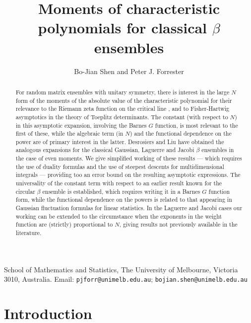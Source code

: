 \documentclass[11pt,a4paper]{article}
\title{\Large\bfseries Moments of characteristic polynomials for classical $\beta$ ensembles}%
\author{Bo-Jian Shen and Peter J. Forrester}
\date{}
\numberwithin{equation}{section} %
\theoremstyle{plain}
\theoremstyle{definition}
\numberwithin{prop}{section}
\numberwithin{cor}{section}
\numberwithin{remark}{section}
\begin{document}
\maketitle


School of Mathematics and Statistics,  The University of Melbourne,
Victoria 3010, Australia. \: \: Email: {\tt pjforr@unimelb.edu.au};  {\tt bojian.shen@unimelb.edu.au} \\








\bigskip

\begin{abstract}
\noindent
For random matrix ensembles with unitary symmetry, there is interest
in the large $N$ form of the moments of the absolute value of the characteristic polynomial for their relevance to the Riemann zeta function on the critical line , and to Fisher-Hartwig asymptotics in the theory of Toeplitz determinants. The constant (with respect to $N$) in this asymptotic expansion, involving the Barnes $G$ function, is most relevant to the first of these, while the algebraic term (in $N$) and the functional dependence on the power are of primary interest in the latter. Desrosiers and Liu \cite{DL14} have obtained the analogous expansions for the classical Gaussian, Laguerre and Jacobi $\beta$ ensembles in the case of even moments. We give simplified working of these results --- which requires the use of duality formulas and the use of steepest descents for multidimensional integrals --- providing too an error bound on the resulting asymptotic expressions. The universality of the constant term with respect to an earlier result known for the circular $\beta$ ensemble is established, which requires writing it in a Barnes $G$ function form, while the functional dependence on the powers is related to that appearing in Gaussian fluctuation formulas for linear statistics. In the Laguerre and Jacobi cases our working can be extended to the circumstance when the exponents in the weight function are (strictly) proportional to $N$, giving results not previously available in the literature.
\end{abstract}



\vspace{3em}

\section{Introduction}
\end{document}

